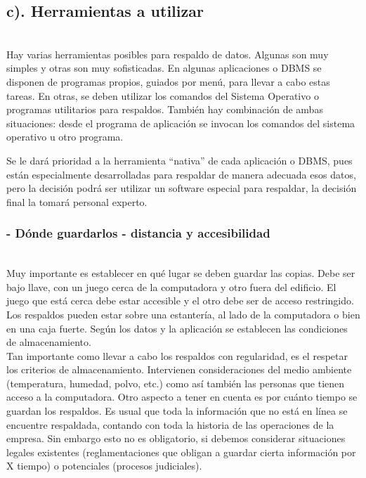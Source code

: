 \subsection{c). Herramientas a utilizar }
\\
Hay varias herramientas posibles para respaldo de datos. Algunas son muy simples y otras son muy sofisticadas. En algunas aplicaciones o DBMS se disponen de programas propios, guiados por menú, para llevar a cabo estas tareas. En otras, se deben utilizar los comandos del Sistema Operativo o programas utilitarios para respaldos. También hay combinación de ambas situaciones: desde el programa de aplicación se invocan los comandos del sistema operativo u otro programa. 
 
Se le dará prioridad a la herramienta “nativa” de cada aplicación o DBMS, pues están especialmente desarrolladas para respaldar de manera adecuada esos datos, pero la decisión podrá ser utilizar un software especial para respaldar, la decisión final la tomará personal experto. 

\subsubsection{- Dónde guardarlos - distancia y accesibilidad}
\\
Muy importante es establecer en qué lugar se deben guardar las copias. Debe ser bajo llave, con un juego cerca de la computadora y otro fuera del edificio. El juego que está cerca debe estar accesible y el otro debe ser de acceso restringido. Los respaldos pueden estar sobre una estantería, al lado de la computadora o bien en una caja fuerte. Según los datos y la aplicación se establecen las condiciones de almacenamiento. 
\\
Tan importante como llevar a cabo los respaldos con regularidad, es el respetar los criterios de almacenamiento. Intervienen consideraciones del medio ambiente (temperatura, humedad, polvo, etc.) como así también las personas que tienen acceso a la computadora.  
Otro aspecto a tener en cuenta es por cuánto tiempo se guardan los respaldos. Es usual que toda la información que no está en línea se encuentre respaldada, contando con toda la historia de las operaciones de la empresa. Sin embargo esto no es obligatorio, si debemos considerar situaciones legales existentes (reglamentaciones que obligan a guardar cierta información por X tiempo) o potenciales (procesos judiciales).

